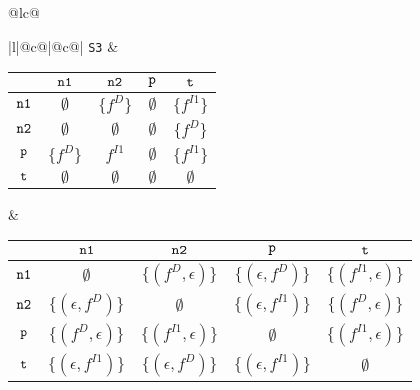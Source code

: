 \documentclass[runningheads,a4paper]{llncs}
\newcommand{\p}{\mbox{\tt p}}
\newcommand{\nO}{\mbox{\tt n1}}
\newcommand{\nT}{\mbox{\tt n2}}
\newcommand{\myt}{\mbox{\tt t}}
\newcommand{\drct}{\ensuremath{D}}
\newcommand{\indrct}{\ensuremath{I}}
\newcommand{\fieldD}[2]{\ensuremath{{#1}_{#2}^\drct}}
\newcommand{\fieldI}[3]{\ensuremath{{#1}_{#2}^{\indrct#3}}}
\begin{document}
\begin{figure}[t]
\begin{tabular}{@{}lc@{}}
{\begin{tabular}[b]{|l|@{}c@{}|@{}c@{}|}
{\tt S3} & 
\begin{tabular}{|c|cccc|} \hline
            & $\nO$  				& $\nT$ 				& $\p$ 			& $\myt$ \\ \hline
  $\nO$ 	& $\emptyset$			& $\{\fieldD{f}{}\}$	& $\emptyset$	& $\{\fieldI{f}{}{1}\}$ \\ \hline
  $\nT$ 	& $\emptyset$			& $\emptyset$			& $\emptyset$	& $\{\fieldD{f}{}\}$ \\ \hline
  $\p$ 		& $\{\fieldD{f}{}\}$	& $\fieldI{f}{}{1}$		& $\emptyset$	& $\{\fieldI{f}{}{1}\}$ \\ \hline
  $\myt$ 	& $\emptyset$			& $\emptyset$			& $\emptyset$	& $\emptyset$ \\ \hline
\end{tabular}
 &
\begin{tabular}{|c|cccc|} \hline
			& $\nO$  						& $\nT$ 							& $\p$ 			& $\myt$ \\ \hline
  $\nO$ 	& $\emptyset$					& $\{(\fieldD{f}{}, \epsilon)\}$		& $\{(\epsilon, \fieldD{f}{})\}$	& $\{(\fieldI{f}{}{1}, \epsilon)\}$ \\ \hline
  $\nT$ 	& $\{(\epsilon, \fieldD{f}{})\}$					& $\emptyset$		& $\{(\epsilon, \fieldI{f}{}{1})\}$	& $\{(\fieldD{f}{}, \epsilon)\}$ \\ \hline
  $\p$ 		& $\{(\fieldD{f}{}, \epsilon)\}$	& $\{(\fieldI{f}{}{1}, \epsilon)\}$	& $\emptyset$	& $\{(\fieldI{f}{}{1}, \epsilon)\}$ \\ \hline
  $\myt$ 	& $\{(\epsilon, \fieldI{f}{}{1})\}$					& $\{(\epsilon, \fieldD{f}{})\}$						& $\{(\epsilon, \fieldI{f}{}{1})\}$	& $\emptyset$ \\ \hline
\end{tabular} \\ \hline


\end{tabular}}
\end{tabular}
\end{figure}
\end{document}
